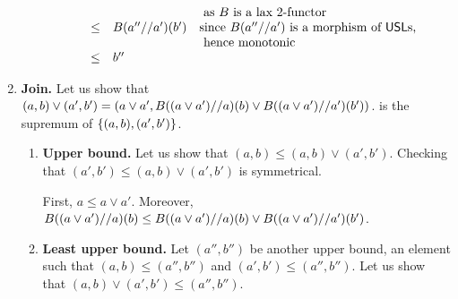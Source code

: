 \begin{definition}
\begin{enumerate}
\begin{enumerate}
\[\begin{array}{rcll}
                                                     &&& \text{ as $B$ is a lax 2-functor} \\
                  & \leq & B(a''//a')(b')       & \text{since $B(a''//a')$ is a morphism of $\mathsf{USL}$s,} \\
                                                     &&& \text{ hence monotonic} \\
                  & \leq & b''
    \end{array}
    \]
  \end{enumerate}
\item {\bf Join.}
  Let us show that $(a, b) \lor (a',b') = (a \lor a', B((a \lor a')//a)(b) \lor B((a \lor a')//a')(b'))$.
  is the supremum of $\{(a, b), (a',b')\}$.
  \begin{enumerate}
  \item {\bf Upper bound.}
    Let us show that $(a, b) \leq (a, b) \lor (a',b')$.
    Checking that $(a', b') \leq (a, b) \lor (a',b')$ is symmetrical.

    First, $a \leq a \lor a'$.
    Moreover, $B((a \lor a')//a)(b) \leq B((a \lor a')//a)(b) \lor B((a \lor a')//a')(b')$.
  \item {\bf Least upper bound.}
    Let $(a'',b'')$ be another upper bound, \ie an element such that $(a, b) \leq (a'', b'')$ and $(a', b') \leq (a'', b'')$.
    Let us show that $(a, b) \lor (a',b') \leq (a'', b'')$.


\end{enumerate}
\end{enumerate}
\end{definition}
